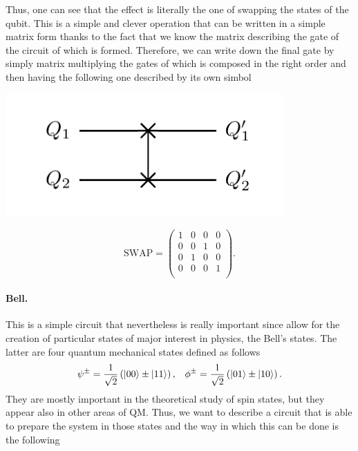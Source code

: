 \noindent
Thus, one can see that the effect is literally the one of swapping the states of the qubit. This is a simple and clever operation that can be written in a simple matrix form thanks to the fact that we know the matrix describing the gate of the circuit of which is formed. Therefore, we can write down the final gate by simply matrix multiplying the gates of which is composed in the right order and then having the following one described by its own simbol

\begin{minipage}{0.45\textwidth}
    \centering
    \includegraphics[width=0.8\textwidth]{Immagini/Swapsim.pdf}
\end{minipage}
\hspace{-1cm}
\begin{minipage}{0.45\textwidth}
    \begin{equation}
        \text{SWAP} = \begin{pmatrix}
            1 & 0 & 0 & 0 \\
            0 & 0 & 1 & 0 \\
            0 & 1 & 0 & 0 \\
            0 & 0 & 0 & 1 \\
        \end{pmatrix}.
    \end{equation}
\end{minipage}

\paragraph{Bell.} This is a simple circuit that nevertheless is really important since allow for the creation of particular states of major interest in physics, the Bell's states. The latter are four quantum mechanical states defined as follows
\begin{align}
    &\psi^{\pm} = \frac{1}{\sqrt{2}}\left( \ket{00} \pm \ket{11} \right), &\phi^{\pm} = \frac{1}{\sqrt{2}}\left( \ket{01} \pm \ket{10} \right).
\end{align}
They are mostly important in the theoretical study of spin states, but they appear also in other areas of QM. Thus, we want to describe a circuit that is able to prepare the system in those states and the way in which this can be done is the following

